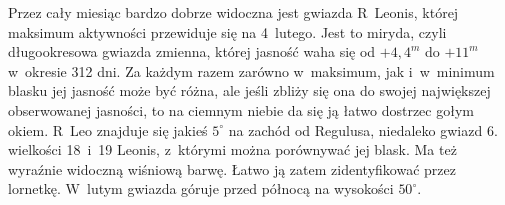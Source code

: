 {\begin{dwieszpalty}
Przez cały miesiąc bardzo dobrze widoczna jest gwiazda R~Leonis, której maksimum aktywności przewiduje się na 4~lutego. Jest to miryda, czyli długookresowa gwiazda zmienna, której jasność waha się od $+4,4^m$ do $+11^m$ w~okresie 312 dni. Za każdym razem zarówno w~maksimum, jak i~w~minimum blasku jej jasność może być różna, ale jeśli zbliży się ona do swojej największej obserwowanej jasności, to na ciemnym niebie da się ją łatwo dostrzec gołym okiem. R~Leo znajduje się jakieś $5^{\circ}$ na zachód od Regulusa, niedaleko gwiazd 6. wielkości 18~i~19 Leonis, z~którymi można porównywać jej blask. Ma też wyraźnie widoczną wiśniową barwę. Łatwo ją zatem zidentyfikować przez lornetkę. W~lutym gwiazda góruje przed północą na wysokości $50^{\circ}$.

\medskip
{}
\end{dwieszpalty}

}\eject
\normalsize